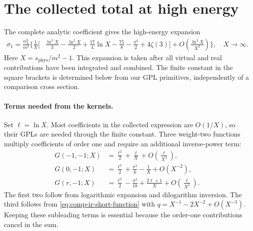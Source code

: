 \section{The collected total at high energy}
\label{sec:comp-total-energy-high}
The complete analytic coefficient gives the high-energy expansion
\begin{equation}
\begin{aligned}
 \sigma_1=\frac{\alpha_{\mathrm T}^3}{m^2}\biggl\{
 \frac1X\biggl[&\frac{\ln^3X}{3}-\frac{\ln^2X}{2}
 +\frac{17}{4}\ln X-\frac{75}{8}-\frac{\pi^2}{2}+4\zeta(3)\biggr]
 +O\!\left(\frac{\ln^3X}{X^2}\right)\biggr\},\quad X\to\infty.
\end{aligned}
\label{eq:comp-collected-total-high}
\end{equation}
Here $X=s_{\mathrm{phys}}/m^2-1$. This expansion is taken after all
virtual and real contributions have been integrated and combined.
The finite constant in the square brackets is determined below from
our GPL primitives, independently of a comparison cross section.

\paragraph{Terms needed from the kernels.} Set $\ell=\ln X$.
Most coefficients in the collected expression are $O(1/X)$, so their
GPLs are needed through the finite constant. Three weight-two
functions multiply coefficients of order one and require an
additional inverse-power term:
\begin{align}
 G(-1,-1;X)&=\frac{\ell^2}{2}+\frac{\ell}{X}
                         +O\!\left(\frac{\ell}{X^2}\right),\\
 G(0,-1;X)&=\frac{\ell^2}{2}+\frac{\pi^2}{6}-\frac1X
                         +O(X^{-2}),\\
 G(r,-1;X)&=\frac{\ell^2}{2}-\frac{\pi^2}{18}
                +\frac{2\ell+1}{X}
                         +O\!\left(\frac{\ell}{X^2}\right).
\end{align}
The first two follow from logarithmic expansion and dilogarithm
inversion. The third follows from \eqref{eq:comp-ir-short-function}
with $q=X^{-1}-2X^{-2}+O(X^{-3})$. Keeping these subleading terms
is essential because the order-one contributions cancel in the sum.


